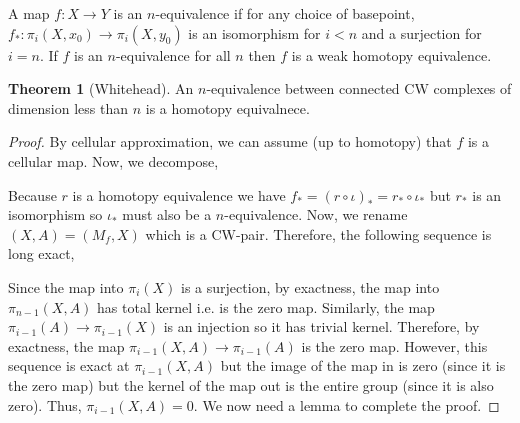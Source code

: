 \documentclass[12pt]{extarticle}
\theoremstyle{definition}
\newtheorem{theorem}{Theorem}[section]
\newenvironment{definition}[1][Definition:]{\begin{trivlist}
\item[\hskip \labelsep {\bfseries #1}]}{\end{trivlist}}
\begin{document}
\begin{definition}
A map $f : X \to Y$ is an $n$-equivalence if for any choice of basepoint, $f_* : \pi_i(X, x_0) \to \pi_i(X, y_0)$ is an isomorphism for $i < n$ and a surjection for $i = n$. If $f$ is an $n$-equivalence for all $n$ then $f$ is a weak homotopy equivalence. 
\end{definition} 

\begin{theorem}[Whitehead]
An $n$-equivalence between connected CW complexes of dimension less than $n$ is a homotopy equivalnece. 
\end{theorem}

\begin{proof}
By cellular approximation, we can assume (up to homotopy) that $f$ is a cellular map. Now, we decompose,
\begin{center}
\end{center}
Because $r$ is a homotopy equivalence we have $f_* = (r \circ \iota)_* = r_* \circ \iota_*$ but $r_*$ is an isomorphism so $\iota_*$ must also be a $n$-equivalence. Now, we rename $(X, A) = (M_f, X)$ which is a CW-pair. Therefore, the following sequence is long exact,
\begin{center}
\end{center}
Since the map into $\pi_i(X)$ is a surjection, by exactness, the map into $\pi_{n-1}(X, A)$ has total kernel i.e. is the zero map. Similarly, the map $\pi_{i-1}(A) \to \pi_{i-1}(X)$ is an injection so it has trivial kernel. Therefore, by exactness, the map $\pi_{i-1}(X, A) \to \pi_{i-1}(A)$ is the zero map. However, this sequence is exact at $\pi_{i - 1}(X, A)$ but the image of the map in is zero (since it is the zero map) but the kernel of the map out is the entire group (since it is also zero). Thus, $\pi_{i-1}(X, A) = 0$. We now need a lemma to complete the proof.  
\end{proof}
\end{document}
